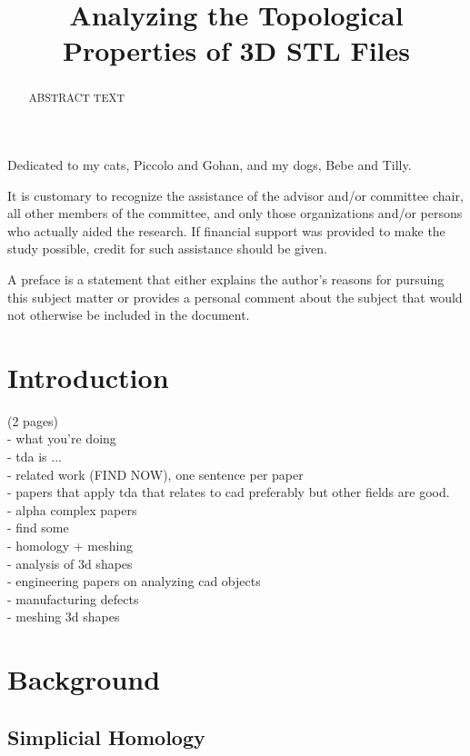 \documentclass[ma]{uncgdissertationexp}
\title{Analyzing the Topological Properties of 3D STL Files}
\theoremstyle{plain}
\theoremstyle{definition}
\theoremstyle{remark}
\begin{document}
\frontmatter      %
\begin{abstract}
ABSTRACT TEXT
\end{abstract}
\maketitlepage  
\makecopyrightpage
\begin{dedication}
Dedicated to my cats, Piccolo and Gohan, and my dogs, Bebe and Tilly.
\end{dedication}
\makeapprovalpage
\begin{acknowledgments}
It is customary to recognize the assistance of the advisor and/or
committee chair, all other members of the committee, and only those
organizations and/or persons who actually aided the research. If
financial support was provided to make the study possible, credit for
such assistance should be given.
\end{acknowledgments}
\begin{preface}
A preface is a statement that either explains the author's
reasons for pursuing this subject matter or provides a personal
comment about the subject that would not otherwise be included in
the document.
\end{preface}
\tableofcontents
\listoftables
\listoffigures
\mainmatter

\chapter{Introduction}
(2 pages)\\
- what you're doing\\
- tda is ...\\
- related work (FIND NOW), one sentence per paper\\
  - papers that apply tda that relates to cad preferably but other fields are good.\\
  - alpha complex papers\\
    - find some\\
    - homology + meshing\\
  - analysis of 3d shapes\\
    - engineering papers on analyzing cad objects\\
    - manufacturing defects\\
  - meshing 3d shapes\\

\chapter{Background}

\section{Simplicial Homology}
\end{document}
